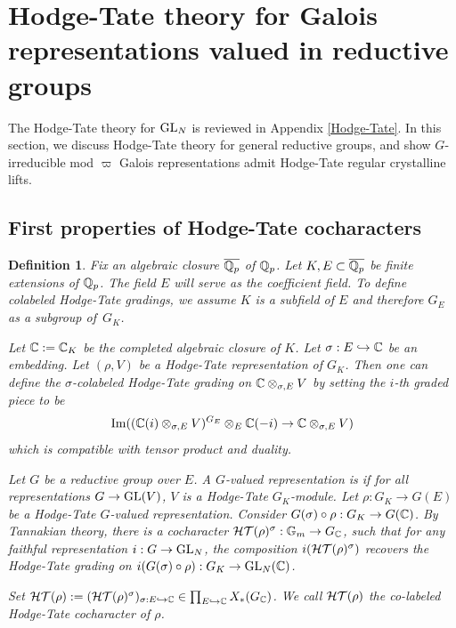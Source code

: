 \documentclass[10pt,a4paper,twoside]{article}
\newtheorem{dfn}{Definition}
\begin{document}
 
\section{Hodge-Tate theory for Galois representations valued in reductive groups}


\label{sec:hodge-tate-cocharacter}

The Hodge-Tate theory for $\operatorname{GL}_N$ is reviewed in Appendix \ref{Hodge-Tate}.
In this section, we discuss Hodge-Tate theory for general reductive groups, and
show $G$-irreducible mod $\varpi$ Galois representations admit Hodge-Tate regular
crystalline lifts.


\subsection{First properties of Hodge-Tate cocharacters}

\begin{dfn}
\label{def:ht}
Fix an algebraic closure $\overline{\mathbb{Q}_p}$ of $\mathbb{Q}_p$.
Let $K, E \subset \overline{\mathbb{Q}_p}$ be finite extensions of $\mathbb{Q}_p$.
The field $E$ will serve as the coefficient field.
To define colabeled Hodge-Tate gradings,
we assume $K$ is a subfield of $E$ and therefore $G_E$ as a subgroup of~$G_K$.


Let ${\mathbb{C}} := {\mathbb{C}}_K$ be the completed algebraic closure of $K$.
Let $\sigma: E\hookrightarrow {\mathbb{C}}$ be an embedding.
Let $(\rho, V)$ be a Hodge-Tate representation of $G_K$.
Then one can define \textit{the $\sigma$-colabeled Hodge-Tate grading} on ${\mathbb{C}}\otimes_{\sigma,E}V$ 
by setting the $i$-th graded piece to be
$$
\operatorname{Im}(({\mathbb{C}}(i)\otimes_{\sigma,E}V)^{G_E}\otimes_E {\mathbb{C}}(-i) \to {\mathbb{C}}\otimes_{\sigma,E}V)
$$
which is compatible with tensor product and duality.

Let $G$ be a reductive group over $E$.
A $G$-valued representation is  if
for all representations $G\to\operatorname{GL}(V)$,
$V$ is a Hodge-Tate $G_K$-module.
Let $\rho: G_K\to G(E)$ be a Hodge-Tate $G$-valued representation.
Consider $G(\sigma)\circ\rho: G_K \to G({\mathbb{C}})$.
By Tannakian theory, 
there is a cocharacter ${\mathcal{HT}}(\rho)^{\sigma}: \mathbb{G}_m\to G_{{\mathbb{C}}}$,
such that for any faithful representation
$i:G\to \operatorname{GL}_N$, the composition
$i({\mathcal{HT}}(\rho)^{\sigma})$ recovers the
Hodge-Tate grading on
$i(G(\sigma)\circ \rho):G_K\to\operatorname{GL}_N({\mathbb{C}})$.

Set ${\mathcal{HT}}(\rho):= ({\mathcal{HT}}(\rho)^{\sigma})_{\sigma:E\hookrightarrow {\mathbb{C}}}\in\prod_{E\hookrightarrow{\mathbb{C}}}X_*(G_{{\mathbb{C}}})$.
We call ${\mathcal{HT}}({\rho})$ the \textit{co-labeled Hodge-Tate cocharacter} of $\rho$. 
\end{dfn}
\end{document}
